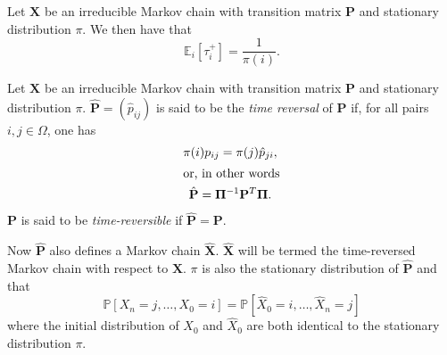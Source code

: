 \begin{proposition}
  \label{prop:2}
  Let $\mathbf{X}$ be an irreducible
  Markov chain with transition matrix $\mathbf{P}$ and stationary
  distribution $\pi$. We then have that
  \begin{equation}
    \label{eq:9}
    \mathbb{E}_{i}[\tau_i^{+}] = \frac{1}{\pi(i)}.
  \end{equation}
\end{proposition}

\begin{definition}
  \label{def:9}
  Let $\mathbf{X}$ be an irreducible Markov chain with transition
  matrix $\mathbf{P}$ and stationary distribution
  $\pi$. $\hat{\mathbf{P}} = (\hat{p}_{ij})$ is said to be the {\em
    time reversal} of $\mathbf{P}$ if, for all pairs $i,j \in \Omega$,
  one has
  \begin{gather}
    \label{eq:16}
    \pi(i) p_{ij} = \pi(j) \hat{p}_{ji}, \\
    \intertext{or, in other words}
    \label{eq:78}
    \hat{\mathbf{P}} = \bm{\Pi}^{-1} \mathbf{P}^{T} \bm{\Pi}. 
  \end{gather}
  $\mathbf{P}$ is said to be {\em time-reversible} if
  $\hat{\mathbf{P}} = \mathbf{P}$.
\end{definition}
Now $\hat{\mathbf{P}}$ also defines a Markov chain
$\hat{\mathbf{X}}$. $\hat{\mathbf{X}}$ will be termed the
time-reversed Markov chain with respect to $\mathbf{X}$. $\pi$ is also
the stationary distribution of $\hat{\mathbf{P}}$ and that
\begin{equation}
  \label{eq:17}
  \mathbb{P}[X_n = j, \dots, X_0 = i] = \mathbb{P}[\hat{X}_0 = i,
  \dots, \hat{X}_n = j] 
\end{equation}
where the initial distribution of $X_0$ and $\hat{X}_0$ are both
identical to the stationary distribution $\pi$.
